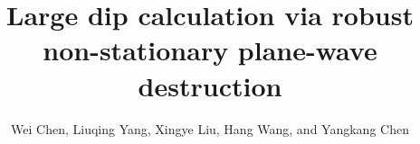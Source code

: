 
\DeclareRobustCommand{\dlo}[1]{}
\DeclareRobustCommand{\wen}[1]{#1}
\DeclareRobustCommand{\old}[1]{}
\DeclareRobustCommand{\new}[1]{#1}


\title{Large dip calculation via robust non-stationary plane-wave destruction}
\renewcommand{\thefootnote}{\fnsymbol{footnote}}
\author{Wei Chen, Liuqing Yang, Xingye Liu, Hang Wang, and Yangkang Chen}
\maketitle

